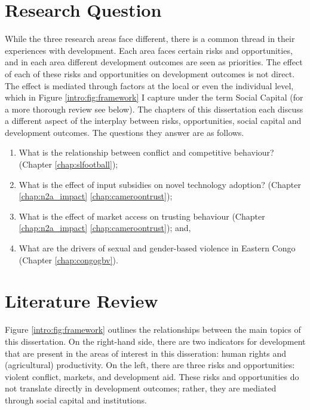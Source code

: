 \section{Research Question}
While the three research areas face different, there is a common thread in their experiences with development. Each area faces certain risks and opportunities, and in each area different development outcomes are seen as priorities. The effect of each of these risks and opportunities on development outcomes is not direct. The effect is mediated through factors at the local or even the individual level, which in Figure \ref{intro:fig:framework} I capture under the term Social Capital (for a more thorough review see below). The chapters of this dissertation each discuss a different aspect of the interplay between risks, opportunities, social capital and development outcomes. The questions they answer are as follows.
\begin{enumerate}
	\item What is the relationship between conflict and competitive behaviour? (Chapter \ref{chap:slfootball});
	\item What is the effect of input subsidies on novel technology adoption? (Chapter \ref{chap:n2a_impact}
\ref{chap:cameroontrust});
	\item What is the effect of market access on trusting behaviour (Chapter \ref{chap:n2a_impact}
\ref{chap:cameroontrust}); and,
	\item What are the drivers of sexual and gender-based violence in Eastern Congo (Chapter \ref{chap:congogbv}).
\end{enumerate}


\section{Literature Review}
Figure \ref{intro:fig:framework} outlines the relationships between the main topics of this dissertation. On the right-hand side, there are two indicators for development that are present in the areas of interest in this disseration: human rights and (agricultural) productivity. On the left, there are three risks and opportunities: violent conflict, markets, and development aid. These risks and opportunities do not translate directly in development outcomes; rather, they are mediated through social capital and institutions.

